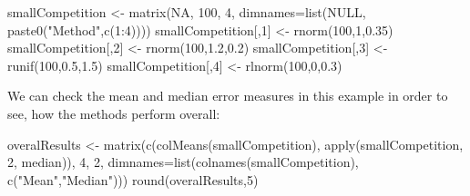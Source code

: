 \documentclass[
]{book}
\newenvironment{Shaded}{\begin{snugshade}}{\end{snugshade}}
\newcommand{\AttributeTok}[1]{\textcolor[rgb]{0.77,0.63,0.00}{#1}}
\newcommand{\ConstantTok}[1]{\textcolor[rgb]{0.00,0.00,0.00}{#1}}
\newcommand{\DecValTok}[1]{\textcolor[rgb]{0.00,0.00,0.81}{#1}}
\newcommand{\FloatTok}[1]{\textcolor[rgb]{0.00,0.00,0.81}{#1}}
\newcommand{\FunctionTok}[1]{\textcolor[rgb]{0.00,0.00,0.00}{#1}}
\newcommand{\NormalTok}[1]{#1}
\newcommand{\OtherTok}[1]{\textcolor[rgb]{0.56,0.35,0.01}{#1}}
\newcommand{\SpecialCharTok}[1]{\textcolor[rgb]{0.00,0.00,0.00}{#1}}
\newcommand{\StringTok}[1]{\textcolor[rgb]{0.31,0.60,0.02}{#1}}
\theoremstyle{definition}
\theoremstyle{definition}
\theoremstyle{definition}
\theoremstyle{definition}
\theoremstyle{remark}
\begin{document}
\begin{Shaded}
\begin{Highlighting}[]
\NormalTok{smallCompetition }\OtherTok{\textless{}{-}} \FunctionTok{matrix}\NormalTok{(}\ConstantTok{NA}\NormalTok{, }\DecValTok{100}\NormalTok{, }\DecValTok{4}\NormalTok{,}
                           \AttributeTok{dimnames=}\FunctionTok{list}\NormalTok{(}\ConstantTok{NULL}\NormalTok{,}
                                         \FunctionTok{paste0}\NormalTok{(}\StringTok{"Method"}\NormalTok{,}\FunctionTok{c}\NormalTok{(}\DecValTok{1}\SpecialCharTok{:}\DecValTok{4}\NormalTok{))))}
\NormalTok{smallCompetition[,}\DecValTok{1}\NormalTok{] }\OtherTok{\textless{}{-}} \FunctionTok{rnorm}\NormalTok{(}\DecValTok{100}\NormalTok{,}\DecValTok{1}\NormalTok{,}\FloatTok{0.35}\NormalTok{)}
\NormalTok{smallCompetition[,}\DecValTok{2}\NormalTok{] }\OtherTok{\textless{}{-}} \FunctionTok{rnorm}\NormalTok{(}\DecValTok{100}\NormalTok{,}\FloatTok{1.2}\NormalTok{,}\FloatTok{0.2}\NormalTok{)}
\NormalTok{smallCompetition[,}\DecValTok{3}\NormalTok{] }\OtherTok{\textless{}{-}} \FunctionTok{runif}\NormalTok{(}\DecValTok{100}\NormalTok{,}\FloatTok{0.5}\NormalTok{,}\FloatTok{1.5}\NormalTok{)}
\NormalTok{smallCompetition[,}\DecValTok{4}\NormalTok{] }\OtherTok{\textless{}{-}} \FunctionTok{rlnorm}\NormalTok{(}\DecValTok{100}\NormalTok{,}\DecValTok{0}\NormalTok{,}\FloatTok{0.3}\NormalTok{)}
\end{Highlighting}
\end{Shaded}

We can check the mean and median error measures in this example in order to see, how the methods perform overall:

\begin{Shaded}
\begin{Highlighting}[]
\NormalTok{overalResults }\OtherTok{\textless{}{-}} \FunctionTok{matrix}\NormalTok{(}\FunctionTok{c}\NormalTok{(}\FunctionTok{colMeans}\NormalTok{(smallCompetition), }
                          \FunctionTok{apply}\NormalTok{(smallCompetition, }\DecValTok{2}\NormalTok{, median)),}
                        \DecValTok{4}\NormalTok{, }\DecValTok{2}\NormalTok{, }\AttributeTok{dimnames=}\FunctionTok{list}\NormalTok{(}\FunctionTok{colnames}\NormalTok{(smallCompetition),}
                                            \FunctionTok{c}\NormalTok{(}\StringTok{"Mean"}\NormalTok{,}\StringTok{"Median"}\NormalTok{)))}
\FunctionTok{round}\NormalTok{(overalResults,}\DecValTok{5}\NormalTok{)}
\end{Highlighting}
\end{Shaded}
\end{document}
